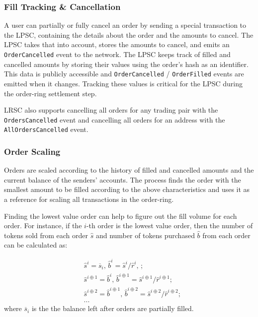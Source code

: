 \documentclass[UTF8,nofonts]{article}
\begin{document}
\begin{multicols}{2}
\subsubsection{Fill Tracking \& Cancellation}

A user can partially or fully cancel an order by sending a special transaction to the LPSC, containing the details about the order and the amounts to cancel. The LPSC takes that into account, stores the amounts to cancel, and emits an \verb|OrderCancelled| event to the network. The LPSC keeps track of filled and cancelled amounts by storing their values using the order's hash as an identifier. This data is publicly accessible and \verb|OrderCancelled| / \verb|OrderFilled| events are emitted when it changes. Tracking these values is critical for the LPSC during the order-ring settlement step.

LRSC also supports cancelling all orders for any trading pair with the \verb|OrdersCancelled| event  and cancelling all orders for an address with the \verb|AllOrdersCancelled| event.


\subsubsection{Order Scaling\label{sec:order_scaling}}
Orders are scaled according to the history of filled and cancelled amounts and the current balance of the senders' accounts. The process finds the order with the smallest amount to be filled according to the above characteristics and uses it as a reference for scaling all transactions in the order-ring.


Finding the lowest value order can help to figure out the fill volume for each order. For instance, if the $i$-th order is the lowest value order, then the number of tokens sold from each order $\hat{s}$ and number of tokens purchased $\hat{b}$ from each order can be calculated as:

\[
\begin{split}
&\hat{s}^{i}=\overline{s}_i\text{, } \hat{b}^{i}=\hat{s}^{i}/ \hat{r}^i\text{, }\text{;}\\
&\hat{s}^{i\oplus 1}=\hat{b}^i\text{, } \hat{b}^{i\oplus 1}=\hat{s}^{i\oplus 1}/ \hat{r}^{i\oplus 1}\text{;}\\
&\hat{s}^{i\oplus 2}=\hat{b}^{i\oplus 1}\text{, } \hat{b}^{i\oplus 2}=\hat{s}^{i\oplus 2}/ \hat{r}^{i\oplus 2}\text{;}\\
& ...
\end{split}
\]
where $\overline{s}_i$ is the the balance left after orders are partially filled.


\end{multicols}
\end{document}
